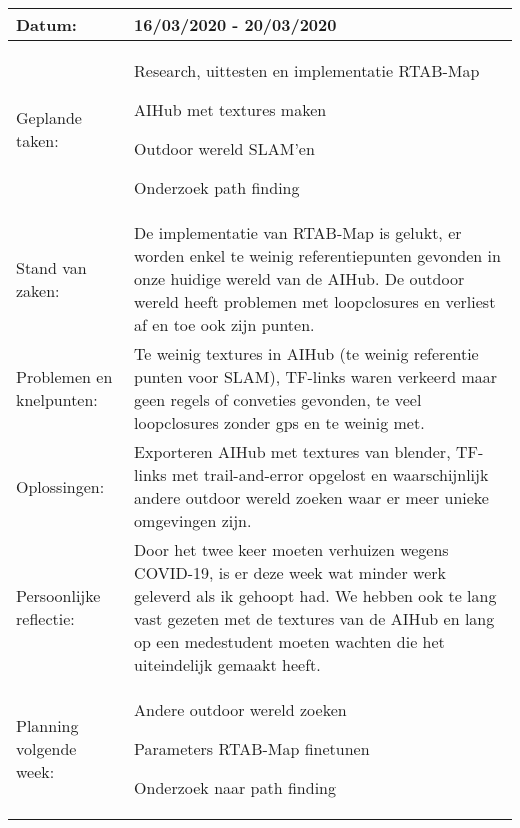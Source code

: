 \begin{tabularx}{\textwidth}{| l | X |}
  \hline
  Datum: & 16/03/2020 - 20/03/2020\\
  \hline
  Geplande taken: &
  \begin{compactitem}
    \item Research, uittesten en implementatie RTAB-Map
    \item AIHub met textures maken
    \item Outdoor wereld SLAM'en
    \item Onderzoek path finding
  \end{compactitem}\\
  \hline
  Stand van zaken: & De implementatie van RTAB-Map is gelukt, er worden enkel te weinig referentiepunten gevonden in onze huidige wereld van de AIHub. De outdoor wereld heeft problemen met loopclosures en verliest af en toe ook zijn punten.\\
  \hline
  Problemen en knelpunten: & Te weinig textures in AIHub (te weinig referentie punten voor SLAM), TF-links waren verkeerd maar geen regels of conveties gevonden, te veel loopclosures zonder gps en te weinig met.\\
  \hline
  Oplossingen: & Exporteren AIHub met textures van blender, TF-links met trail-and-error opgelost en waarschijnlijk andere outdoor wereld zoeken waar er meer unieke omgevingen zijn.\\
  \hline
  Persoonlijke reflectie: & Door het twee keer moeten verhuizen wegens COVID-19, is er deze week wat minder werk geleverd als ik gehoopt had. We hebben ook te lang vast gezeten met de textures van de AIHub en lang op een medestudent moeten wachten die het uiteindelijk gemaakt heeft.\\
  \hline
  Planning volgende week: &
  \begin{compactitem}
    \item Andere outdoor wereld zoeken
    \item Parameters RTAB-Map finetunen
    \item Onderzoek naar path finding
  \end{compactitem}\\
  \hline
\end{tabularx}